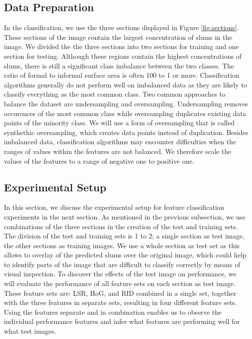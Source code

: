 \subsection{Data Preparation}

In the classification, we use the three sections displayed in Figure \ref{fig:sections}. These sections of the image contain the largest concentration of slums in the image. We divided the the three sections into two sections for training and one section for testing. Although these regions contain the highest concentrations of slums, there is still a significant class imbalance between the two classes. The ratio of formal to informal surface area is often 100 to 1 or more. Classification algorithms generally do not perform well on imbalanced data as they are likely to classify everything as the most common class. Two common approaches to balance the dataset are undersampling and oversampling. Undersampling removes occurences of the most common class while oversampling duplicates existing data points of the minority class. We will use a form of oversampling that is called synthethic oversampling, which creates data points instead of duplication. Besides imbalanced data, classification algorithms may encounter difficulties when the ranges of values within the features are not balanced. We therefore scale the values of the features to a range of negative one to positive one.

\subsection{Experimental Setup}

In this section, we discuss the experimental setup for feature classification experiments in the next section. As mentioned in the previous subsection, we use combinations of the three sections in the creation of the test and training sets. The division of the test and training sets is 1 to 2; a single section as test image, the other sections as training images. We use a whole section as test set as this allows to overlay of the predicted slums over the original image, which could help to identify parts of the image that are difficult to classify correctly by means of visual inspection. To discover the effects of the test image on performance, we will evaluate the performance of all feature sets on each section as test image. These feature sets are: LSR, HoG, and RID combined in a single set, together with the three features in separate sets, resulting in four different feature sets. Using the features separate and in combination enables us to observe the individual performance features and infer what features are performing well for what test images.

